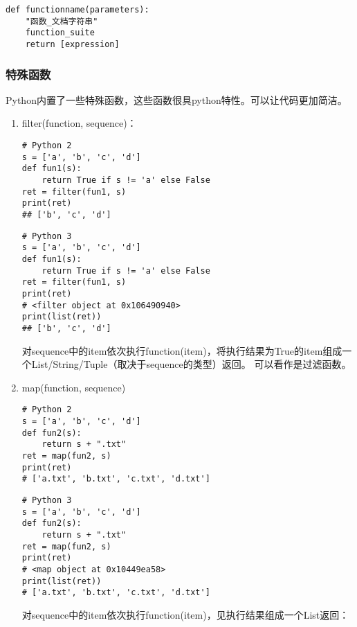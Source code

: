 \begin{verbatim}
def functionname(parameters):
    "函数_文档字符串"
    function_suite
    return [expression]
\end{verbatim}

\subsubsection{特殊函数}
Python内置了一些特殊函数，这些函数很具python特性。可以让代码更加简洁。

\begin{enumerate}
\item filter(function, sequence)：
\begin{verbatim}
# Python 2
s = ['a', 'b', 'c', 'd']
def fun1(s):
    return True if s != 'a' else False
ret = filter(fun1, s)
print(ret)
## ['b', 'c', 'd']
\end{verbatim}

\begin{verbatim}
# Python 3
s = ['a', 'b', 'c', 'd']
def fun1(s):
    return True if s != 'a' else False
ret = filter(fun1, s)
print(ret)
# <filter object at 0x106490940>
print(list(ret))
## ['b', 'c', 'd']
\end{verbatim}

对sequence中的item依次执行function(item)，将执行结果为True的item组成一个List/String/Tuple（取决于sequence的类型）返回。
可以看作是过滤函数。

\item map(function, sequence) 
\begin{verbatim}
# Python 2
s = ['a', 'b', 'c', 'd'] 
def fun2(s):
    return s + ".txt"
ret = map(fun2, s)
print(ret)
# ['a.txt', 'b.txt', 'c.txt', 'd.txt']
\end{verbatim}


\newpage
\begin{verbatim}
# Python 3
s = ['a', 'b', 'c', 'd'] 
def fun2(s):
    return s + ".txt"
ret = map(fun2, s)
print(ret)
# <map object at 0x10449ea58>
print(list(ret))
# ['a.txt', 'b.txt', 'c.txt', 'd.txt']
\end{verbatim}

对sequence中的item依次执行function(item)，见执行结果组成一个List返回：


\end{enumerate}
